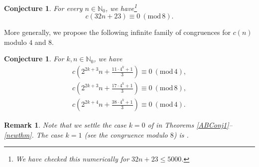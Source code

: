 \documentclass[12pt,reqno]{amsart}
\renewcommand{\(}{\left\(}
\renewcommand{\)}{\right\)}
\numberwithin{equation}{section}
\theoremstyle{plain}
\newtheorem{conjecture}[theorem]{Conjecture}
\theoremstyle{definition}
\newtheorem*{remark}{Remark}
\numberwithin{equation}{section}
\renewcommand{\pmod}[1]{\ \left( \mathrm{mod} \, #1 \right)}
\begin{document}
\begin{conjecture}\label{conj1}
	For every $n\in \mathbb{N}_0$, we have\footnote{We have checked this numerically for $32n+23\le 5000$.}
	\[
	c(32n+23)\equiv 0 \pmod 8.
	\]
\end{conjecture}

 More generally, we propose the following infinite family of congruences for $c(n)$ modulo $4$ and $8$. 

\begin{conjecture}\label{conj2}
For $k,n\in \mathbb{N}_0$, we have
\begin{align*}
c\left(2^{2k+3}n+\frac{11\cdot 4^k+1}{3}\right)\equiv 0\pmod{4},\\
c\left(2^{2k+3}n+\frac{17\cdot 4^k+1}{3}\right)\equiv 0\pmod{8},\\
c\left(2^{2k+4}n+\frac{38\cdot 4^k+1}{3}\right)\equiv 0\pmod{4}.
\end{align*}	
\end{conjecture}

\begin{remark}
{\it Note that we settle the case $k=0$ of  in Theorems \ref{ABConj1}--\ref{newthm}. The case $k=1$ (see the congruence modulo $8$) is .}
\end{remark}






\end{document}
